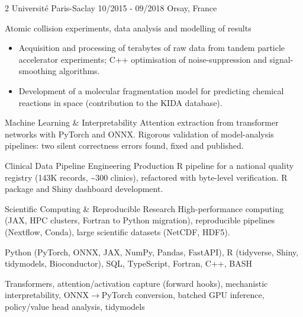 \documentclass{thejus_cv}
\begin{document}
\begin{paracol}{2}
\vspace{0.8em}
             {Universit\'e Paris-Saclay}
             {10/2015 - 09/2018}
             {Orsay, France}
             {Atomic collision experiments, data analysis and modelling of results
             \begin{itemize}
                 \item Acquisition and processing of terabytes of raw data from tandem particle accelerator experiments; C++ optimisation of noise-suppression and signal-smoothing algorithms.
                 \item Development of a molecular fragmentation model for predicting chemical reactions in space (contribution to the KIDA database).
             \end{itemize}}


\switchcolumn



\cvstrength{\faStar}
           {Machine Learning \& Interpretability}
           {Attention extraction from transformer networks with PyTorch and ONNX. Rigorous validation of model-analysis pipelines: two silent correctness errors found, fixed and published.}

\cvstrength{\faLightbulb}
           {Clinical Data Pipeline Engineering}
           {Production R pipeline for a national quality registry (143K records, \textasciitilde300 clinics), refactored with byte-level verification. R package and Shiny dashboard development.}

\cvstrength{\faAward}
           {Scientific Computing \& Reproducible Research}
           {High-performance computing (JAX, HPC clusters, Fortran to Python migration), reproducible pipelines (Nextflow, Conda), large scientific datasets (NetCDF, HDF5).}


         {Python (PyTorch, ONNX, JAX, NumPy, Pandas, FastAPI), R (tidyverse, Shiny, tidymodels, Bioconductor), SQL, TypeScript, Fortran, C++, BASH}

         {Transformers, attention/activation capture (forward hooks), mechanistic interpretability, ONNX$\rightarrow$PyTorch conversion, batched GPU inference, policy/value head analysis, tidymodels}


\end{paracol}
\end{document}

